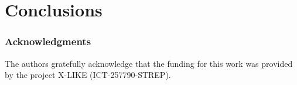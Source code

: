 \documentclass{article} %
\begin{document}
\section{Conclusions}



\subsubsection*{Acknowledgments}
The authors gratefully acknowledge that the funding for this work was provided by the project X-LIKE (ICT-257790-STREP)\cite{xlike}.





\end{document}
